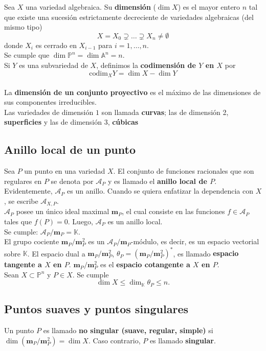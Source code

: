 \documentclass[12pt,a4paper]{report}
\newcommand{\al}{\mathscr{A}_{P}}
\newcommand{\msp}{\mathbf{m}_{P}}
\newcommand{\ea}{\mathbb{A}^{n}}
\newcommand{\cod}{\mbox{codim}}
\newcommand{\ep}{\mathbb{P}^{n}}
\newcommand{\K}{\mathbb{K}}
\begin{document}
Sea $X$ una variedad algebraica. Su \textbf{dimensión} ($\dim X$) es el mayor entero $n$ tal que existe una sucesión estrictamente decreciente de variedades algebraicas (del mismo tipo) $$X=X_{0} \supsetneq \ldots \supsetneq X_{n} \neq \emptyset $$ donde $X_{i}$ es cerrado en $X_{i-1}$ para $i=1, \ldots , n $. \\
Se cumple que $\dim \ep = \dim \ea =n$.\\

Si $Y$ es una subvariedad de $X$, definimos la \textbf{codimensión de $Y$ en $X$} por $$ \cod _{X} Y  = \dim X - \dim Y $$ \\

La \textbf{dimensión de un conjunto proyectivo} es el máximo de las dimensiones de sus componentes irreducibles. \\
Las variedades de dimensión $1$ son llamada \textbf{curvas}; las de dimensión 2, \textbf{superficies} y las de dimensión 3, \textbf{cúbicas}



\subsection{Anillo local de un punto}
Sea $P$ un punto en una variedad $X$. El conjunto de funciones racionales que son regulares en $P$ se denota por $\al$ y es llamado el \textbf{anillo local de $P$}. Evidentemente, $\al$ es un anillo. Cuando se quiera enfatizar la dependencia con $X$, se escribe $\mathscr{A}_{X,P} $.\\

$\al$ posee un único ideal maximal $\msp $, el cual consiste en las funciones $f \in \al$ tales que $f(P)=0$. Luego, $\al$ es un anillo local.\\
Se cumple: $\al / \msp = \K$.\\
El grupo cociente $\msp / \msp ^{2}$ es un $\al / \msp$-módulo, es decir, es un espacio vectorial sobre $\K$. El espacio dual a $\msp / \msp ^{2}$,  $\theta_{P}=(\msp / \msp ^{2})^{*}$, es llamado \textbf{espacio tangente a $X$ en $P$}. $\msp / \msp ^{2}$ es el \textbf{espacio cotangente a $X$ en $P$}.\\

Sean $X\subset \ep$ y $P \in X$. Se cumple $$\dim X \leq \dim_{\K} \theta_
P \leq n.$$


\subsection{Puntos suaves y puntos singulares}
Un punto $P$ es llamado \textbf{no singular (suave, regular, simple)} si $\dim (\msp / \msp ^{2})=\dim X$. Caso contrario, $P$ es llamado \textbf{singular}.\\
\end{document}
